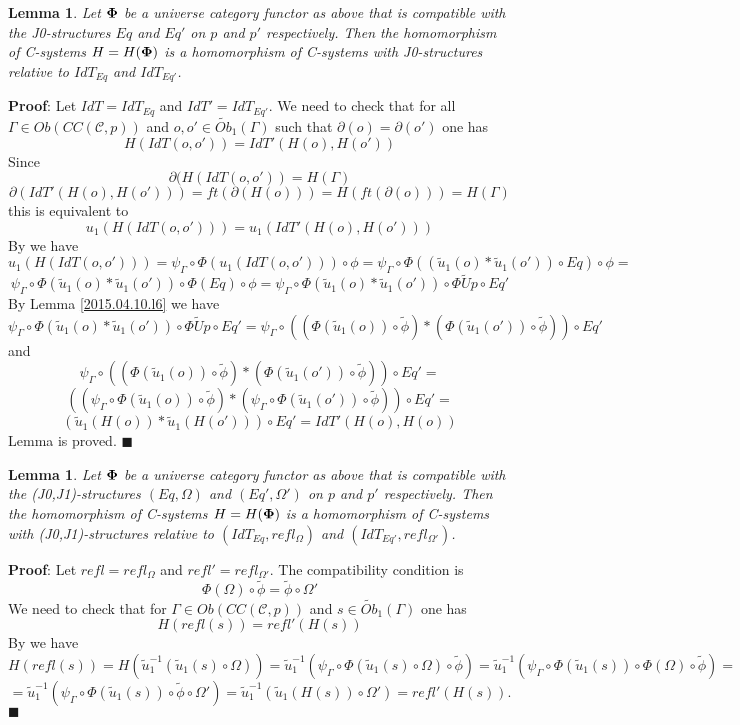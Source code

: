 \documentclass[12pt]{article}
\numberwithin{equation}{section}
\newenvironment{myproof}{{\bf Proof}:}{$\blacksquare$ \vskip 5mm }
\newtheorem{lemma}[proposition]{Lemma}
\newcommand{\llabel}[1]{\label{#1}}
\newcommand{\wt}{\widetilde}
\newcommand{\toCC}{CC} %
\begin{document}
\begin{lemma}
\llabel{2015.04.12.l1} Let ${\bf\Phi}$ be a universe category functor as above
that is compatible with the J0-structures $Eq$ and $Eq'$ on $p$ and $p'$
respectively. Then the homomorphism of C-systems $H=H({\bf\Phi})$ is a
homomorphism of C-systems with J0-structures relative to $IdT_{Eq}$ and
$IdT_{Eq'}$.
\end{lemma}
%
\begin{myproof}
Let $IdT=IdT_{Eq}$ and $IdT'=IdT_{Eq'}$. We need to check that for all
$\Gamma\in Ob(\toCC({\mathcal C},p))$ and $o,o'\in \wt{Ob}_1(\Gamma)$ such that
$\partial(o)=\partial(o')$ one has
%
$$H(IdT(o,o'))=IdT'(H(o),H(o'))$$
%
Since
%
$$\partial(H(IdT(o,o'))=H(\Gamma)$$
%
$$\partial(IdT'(H(o),H(o')))=ft(\partial(H(o)))=H(ft(\partial(o)))=H(\Gamma)$$
%
this is equivalent to
%
$$u_1(H(IdT(o,o')))=u_1(IdT'(H(o),H(o')))$$
%
By \cite[Lemma 6.1(1)]{fromunivwithPi} we have
%
$$u_1(H(IdT(o,o')))=\psi_{\Gamma}\circ\Phi(u_1(IdT(o,o')))\circ\phi=\psi_{\Gamma}\circ\Phi((\wt{u}_1(o)*\wt{u}_1(o'))\circ
Eq)\circ\phi=$$
%
$$\psi_{\Gamma}\circ\Phi(\wt{u}_1(o)*\wt{u}_1(o'))\circ
\Phi(Eq)\circ\phi=\psi_{\Gamma}\circ\Phi(\wt{u}_1(o)*\wt{u}_1(o'))\circ
\Phi\wt{U}p\circ Eq'$$
%
By Lemma \ref{2015.04.10.l6} we have
%
$$\psi_{\Gamma}\circ\Phi(\wt{u}_1(o)*\wt{u}_1(o'))\circ \Phi\wt{U}p\circ
Eq'=\psi_{\Gamma}\circ((\Phi(\wt{u}_1(o))\circ\wt{\phi})*(\Phi(\wt{u}_1(o'))\circ\wt{\phi}))\circ
Eq'$$
%
and \cite[Lemma 6.1(2)]{fromunivwithPi}
%
$$\psi_{\Gamma}\circ((\Phi(\wt{u}_1(o))\circ\wt{\phi})*(\Phi(\wt{u}_1(o'))\circ\wt{\phi}))\circ
Eq'=$$
$$((\psi_{\Gamma}\circ\Phi(\wt{u}_1(o))\circ\wt{\phi})*(\psi_{\Gamma}\circ\Phi(\wt{u}_1(o'))\circ\wt{\phi}))\circ
Eq'=$$
$$(\wt{u}_1(H(o))*\wt{u}_1(H(o')))\circ Eq'=IdT'(H(o),H(o))$$
%
Lemma is proved.
\end{myproof}
%
\begin{lemma}
\llabel{2015.04.12.l2} Let ${\bf\Phi}$ be a universe category functor as above
that is compatible with the (J0,J1)-structures $(Eq,\Omega)$ and
$(Eq',\Omega')$ on $p$ and $p'$ respectively. Then the homomorphism of
C-systems $H=H({\bf\Phi})$ is a homomorphism of C-systems with
(J0,J1)-structures relative to $(IdT_{Eq},refl_{\Omega})$ and
$(IdT_{Eq'},refl_{\Omega'})$.
\end{lemma}
%
\begin{myproof}
Let $refl=refl_{\Omega}$ and $refl'=refl_{\Omega'}$. The compatibility
condition is
%
$$\Phi(\Omega)\circ\wt{\phi}=\wt{\phi}\circ\Omega'$$
%
We need to check that for $\Gamma\in Ob(\toCC({\mathcal C},p))$ and $s\in
\wt{Ob}_1(\Gamma)$ one has
%
$$H(refl(s))=refl'(H(s))$$
%
By \cite[Lemma 6.1(2)]{fromunivwithPi} we have
%
$$H(refl(s))=H(\wt{u}_1^{-1}(\wt{u}_1(s)\circ\Omega))=\wt{u}_1^{-1}(\psi_{\Gamma}\circ\Phi(\wt{u}_1(s)\circ\Omega)\circ\wt{\phi})=\wt{u}_1^{-1}(\psi_{\Gamma}\circ\Phi(\wt{u}_1(s))\circ\Phi(\Omega)\circ
\wt{\phi})=$$
$$=\wt{u}_1^{-1}(\psi_{\Gamma}\circ\Phi(\wt{u}_1(s))\circ\wt{\phi}\circ\Omega')=\wt{u}_1^{-1}(\wt{u}_1(H(s))\circ\Omega')=refl'(H(s)).$$
\end{myproof}
%
\end{document}
